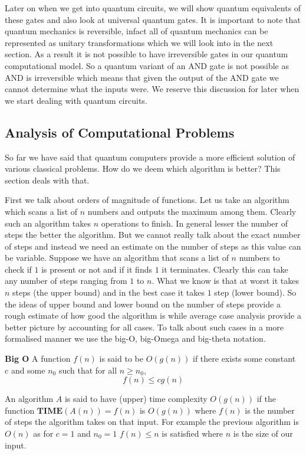 Later on when we get into quantum circuits, we will show quantum equivalents of these gates and also look at universal quantum gates. It is important to note that quantum mechanics is reversible, infact all of quantum mechanics can be represented as unitary transformations which we will look into in the next section. As a result it is not possible to have irreversible gates in our quantum computational model. So a quantum variant of an AND gate is not possible as AND is irreversible which means that given the output of the AND gate we cannot determine what the inputs were. We reserve this discussion for later when we start dealing with quantum circuits.

\subsection{Analysis of Computational Problems}

So far we have said that quantum computers provide a more efficient solution of various classical problems. How do we deem which algorithm is better? This section deals with that.

First we talk about orders of magnitude of functions. Let us take an algorithm which scans a list of $n$ numbers and outputs the maximum among them. Clearly such an algorithm takes $n$ operations to finish. In general lesser the number of steps the better the algorithm. But we cannot really talk about the exact number of steps and instead we need an estimate on the number of steps as this value can be variable. Suppose we have an algorithm that scans a list of $n$ numbers to check if $1$ is present or not and if it finds $1$ it terminates. Clearly this can take any number of steps ranging from $1$ to $n$. What we know is that at worst it takes $n$ steps (the upper bound) and in the best case it takes $1$ step (lower bound). So the ideas of upper bound and lower bound on the number of steps provide a rough estimate of how good the algorithm is while average case analysis provide a better picture by accounting for all cases. To talk about such cases in a more formalised manner we use the big-O, big-Omega and big-theta notation.

\begin{definition}
\textbf{Big O} A function $f(n)$ is said to be $O(g(n))$ if there exists some constant c and some $n_0$ such that for all $n \geq n_0$, $$ f(n) \leq cg(n)$$
\end{definition}
An algorithm $A$ is said to have (upper) time complexity $O(g(n))$ if the function $\textbf{TIME}(A(n)) = f(n)$ is $O(g(n))$ where $f(n)$ is the number of steps the algorithm takes on that input.
For example the previous algorithm is $O(n)$ as for $c = 1$ and $n_0 = 1$
$f(n) \leq n$ is satisfied where $n$ is the size of our input.

